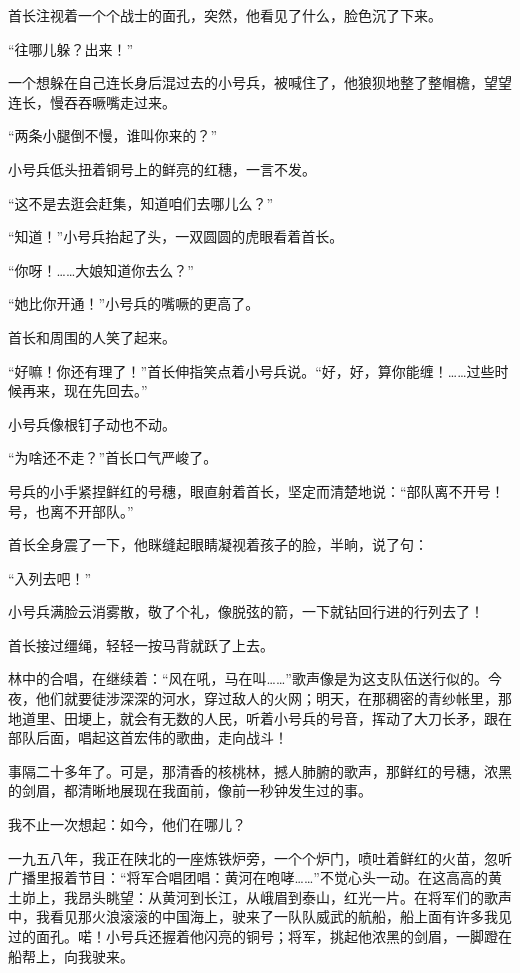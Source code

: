 \documentclass[12pt,UTF-8,openany]{ctexbook}
\begin{document}
\begin{normalsize}
    首长注视着一个个战士的面孔，突然，他看见了什么，脸色沉了下来。
    
    “往哪儿躲？出来！”
    
    一个想躲在自己连长身后混过去的小号兵，被喊住了，他狼狈地整了整帽檐，望望连长，慢吞吞噘嘴走过来。
    
    “两条小腿倒不慢，谁叫你来的？”
    
    小号兵低头扭着铜号上的鲜亮的红穗，一言不发。
    
    “这不是去逛会赶集，知道咱们去哪儿么？”
    
    “知道！”小号兵抬起了头，一双圆圆的虎眼看着首长。
    
    “你呀！……大娘知道你去么？”
    
    “她比你开通！”小号兵的嘴噘的更高了。
    
    首长和周围的人笑了起来。
    
    “好嘛！你还有理了！”首长伸指笑点着小号兵说。“好，好，算你能缠！……过些时候再来，现在先回去。”
    
    小号兵像根钉子动也不动。
    
    “为啥还不走？”首长口气严峻了。
    
    号兵的小手紧捏鲜红的号穗，眼直射着首长，坚定而清楚地说：“部队离不开号！号，也离不开部队。”
    
    首长全身震了一下，他眯缝起眼睛凝视着孩子的脸，半晌，说了句：
    
    “入列去吧！”
    
    小号兵满脸云消雾散，敬了个礼，像脱弦的箭，一下就钻回行进的行列去了！
    
    首长接过缰绳，轻轻一按马背就跃了上去。
    
    林中的合唱，在继续着：“风在吼，马在叫……”歌声像是为这支队伍送行似的。今夜，他们就要徒涉深深的河水，穿过敌人的火网；明天，在那稠密的青纱帐里，那地道里、田埂上，就会有无数的人民，听着小号兵的号音，挥动了大刀长矛，跟在部队后面，唱起这首宏伟的歌曲，走向战斗！
    
    事隔二十多年了。可是，那清香的核桃林，撼人肺腑的歌声，那鲜红的号穗，浓黑的剑眉，都清晰地展现在我面前，像前一秒钟发生过的事。
    
    我不止一次想起：如今，他们在哪儿？
    
    一九五八年，我正在陕北的一座炼铁炉旁，一个个炉门，喷吐着鲜红的火苗，忽听广播里报着节目：“将军合唱团唱：黄河在咆哮……”不觉心头一动。在这高高的黄土峁上，我昂头眺望：从黄河到长江，从峨眉到泰山，红光一片。在将军们的歌声中，我看见那火浪滚滚的中国海上，驶来了一队队威武的航船，船上面有许多我见过的面孔。喏！小号兵还握着他闪亮的铜号；将军，挑起他浓黑的剑眉，一脚蹬在船帮上，向我驶来。
    

\end{normalsize}
\end{document}
